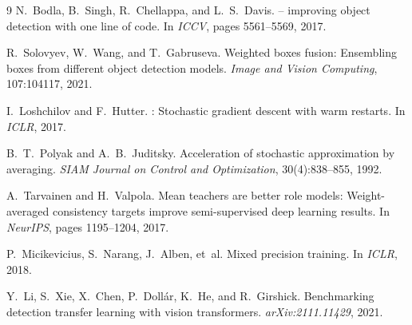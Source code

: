 \documentclass[11pt,a4paper]{article}
\begin{document}
\begin{thebibliography}{9}
N.~Bodla, B.~Singh, R.~Chellappa, and L.~S.~Davis.
 -- improving object detection with one line of code.
\newblock In \emph{ICCV}, pages 5561--5569, 2017.

R.~Solovyev, W.~Wang, and T.~Gabruseva.
\newblock Weighted boxes fusion: Ensembling boxes from different object detection models.
\newblock \emph{Image and Vision Computing}, 107:104117, 2021.

I.~Loshchilov and F.~Hutter.
: Stochastic gradient descent with warm restarts.
\newblock In \emph{ICLR}, 2017.

B.~T.~Polyak and A.~B.~Juditsky.
\newblock Acceleration of stochastic approximation by averaging.
\newblock \emph{SIAM Journal on Control and Optimization}, 30(4):838--855, 1992.

A.~Tarvainen and H.~Valpola.
\newblock Mean teachers are better role models: Weight-averaged consistency targets improve semi-supervised deep learning results.
\newblock In \emph{NeurIPS}, pages 1195--1204, 2017.

P.~Micikevicius, S.~Narang, J.~Alben, et~al.
\newblock Mixed precision training.
\newblock In \emph{ICLR}, 2018.

Y.~Li, S.~Xie, X.~Chen, P.~Doll\'{a}r, K.~He, and R.~Girshick.
\newblock Benchmarking detection transfer learning with vision transformers.
\newblock \emph{arXiv:2111.11429}, 2021.

\end{thebibliography}
\end{document}
